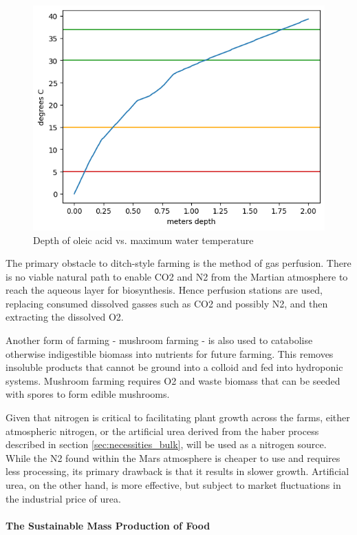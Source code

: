 \documentclass[fleqn,10pt]{Stylesheet} %
\begin{document}
\begin{figure}
    \centering
    \includegraphics[width=\linewidth]{figures/fig_bp.png}
    \caption{Depth of oleic acid vs. maximum water temperature}
    \label{fig:oleic_acid_bp}
\end{figure}

The primary obstacle to ditch-style farming is the method of gas perfusion. There is no viable natural path to enable CO2 and N2 from the Martian atmosphere to reach the aqueous layer for biosynthesis. Hence perfusion stations are used, replacing consumed dissolved gasses such as CO2 and possibly N2, and then extracting the dissolved O2. 

Another form of farming - mushroom farming - is also used to catabolise otherwise indigestible biomass into nutrients for future farming. This removes insoluble products that cannot be ground into a colloid and fed into hydroponic systems. Mushroom farming requires O2 and waste biomass that can be seeded with spores to form edible mushrooms.

Given that nitrogen is critical to facilitating plant growth across the farms, either atmospheric nitrogen, or the artificial urea derived from the haber process described in section \ref{sec:necessities_bulk}, will be used as a nitrogen source. While the N2 found within the Mars atmosphere is cheaper to use and requires less processing, its primary drawback is that it results in slower growth. Artificial urea, on the other hand, is more effective, but subject to market fluctuations in the industrial price of urea.

\paragraph{The Sustainable Mass Production of Food}
\end{document}
